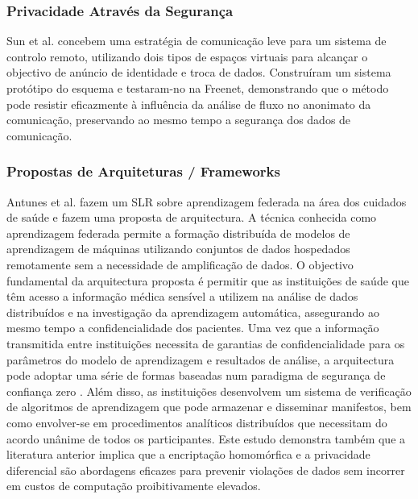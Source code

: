 \documentclass[conference]{IEEEtran}
\begin{document}
\subsubsection{Privacidade Através da Segurança}

Sun et al. \cite{SunSecure} concebem uma estratégia de comunicação leve para
um sistema de controlo remoto, utilizando dois tipos de espaços virtuais para
alcançar o objectivo de anúncio de identidade e troca de dados. Construíram
um sistema protótipo do esquema e testaram-no na Freenet, demonstrando que
o método pode resistir eficazmente à influência da análise de fluxo no anonimato
da comunicação, preservando ao mesmo tempo a segurança dos dados de comunicação.


\subsubsection{Propostas de Arquiteturas / Frameworks}

Antunes et al. \cite{AntunesFederated} fazem um SLR sobre aprendizagem federada
na área dos cuidados de saúde e fazem uma proposta de arquitectura. A técnica
conhecida como aprendizagem federada permite a formação distribuída de modelos
de aprendizagem de máquinas utilizando conjuntos de dados hospedados remotamente
sem a necessidade de amplificação de dados. O objectivo fundamental da arquitectura
proposta é permitir que as instituições de saúde que têm acesso a informação
médica sensível a utilizem na análise de dados distribuídos e na investigação
da aprendizagem automática, assegurando ao mesmo tempo a confidencialidade dos
pacientes. Uma vez que a informação transmitida entre instituições necessita
de garantias de confidencialidade para os parâmetros do modelo de aprendizagem
e resultados de análise, a arquitectura pode adoptar uma série de formas baseadas
num paradigma de segurança de confiança zero \cite{ChenSecurity}. Além disso,
as instituições desenvolvem um sistema de verificação de algoritmos de aprendizagem
que pode armazenar e disseminar manifestos, bem como envolver-se em procedimentos
analíticos distribuídos que necessitam do acordo unânime de todos os participantes.
Este estudo demonstra também que a literatura anterior implica que a encriptação
homomórfica e a privacidade diferencial são abordagens eficazes para prevenir
violações de dados sem incorrer em custos de computação proibitivamente elevados.
\end{document}
